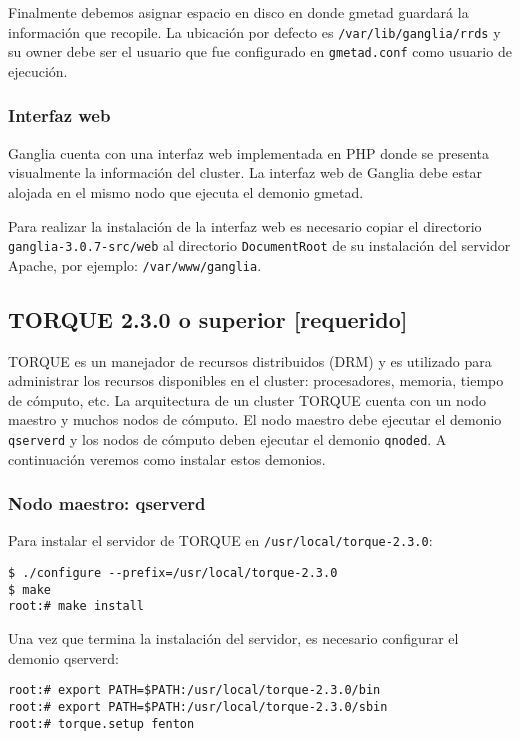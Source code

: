 \documentclass[a4paper,10pt,spanish]{article}
\begin{document}
Finalmente debemos asignar espacio en disco en donde gmetad guardar\'{a} la informaci\'{o}n que recopile. La ubicaci\'{o}n por defecto es \mbox{\texttt{/var/lib/ganglia/rrds}} y su owner debe ser el usuario que fue configurado en \texttt{gmetad.conf} como usuario de ejecuci\'{o}n.

\subsubsection{Interfaz web}

Ganglia cuenta con una interfaz web implementada en PHP donde se presenta visualmente la informaci\'{o}n del cluster. La interfaz web de Ganglia debe estar alojada en el mismo nodo que ejecuta el demonio gmetad.

Para realizar la instalaci\'{o}n de la interfaz web es necesario copiar el directorio \mbox{\texttt{ganglia-3.0.7-src/web}} al directorio \texttt{DocumentRoot} de su instalaci\'{o}n del servidor Apache, por ejemplo: \mbox{\texttt{/var/www/ganglia}}.

\subsection{TORQUE 2.3.0 o superior \small{[requerido]}}

TORQUE\cite{torque} es un manejador de recursos distribuidos (DRM) y es utilizado para administrar los recursos disponibles en el cluster: procesadores, memoria, tiempo de c\'{o}mputo, etc. La arquitectura de un cluster TORQUE cuenta con un nodo maestro y muchos nodos de c\'{o}mputo. El nodo maestro debe ejecutar el demonio \texttt{qserverd} y los nodos de c\'{o}mputo deben ejecutar el demonio \texttt{qnoded}. A continuaci\'{o}n veremos como instalar estos demonios.

\subsubsection{Nodo maestro: qserverd}

Para instalar el servidor de TORQUE en \mbox{\texttt{/usr/local/torque-2.3.0}}:

\begin{verbatim}
$ ./configure --prefix=/usr/local/torque-2.3.0 
$ make 
root:# make install
\end{verbatim}

Una vez que termina la instalaci\'{o}n del servidor, es necesario configurar el demonio qserverd:

\begin{verbatim}
root:# export PATH=$PATH:/usr/local/torque-2.3.0/bin
root:# export PATH=$PATH:/usr/local/torque-2.3.0/sbin
root:# torque.setup fenton
\end{verbatim}
\end{document}
